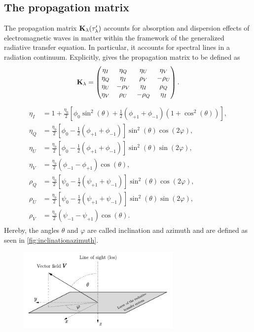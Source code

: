 \documentclass[a4paper,12pt]{report}
\def\lk#1{{\color{black}{#1}}}
\begin{document}
\subsection{The propagation matrix}\label{sec:propagationmatrix}
The propagation matrix $\boldsymbol{\mathbf{K}}_\lambda(\tau_\lambda^\prime)$ accounts for absorption and dispersion effects of electromagnetic waves in matter within the framework of the generalized radiative transfer equation. In particular, it accounts for spectral lines in a radiation continuum. Explicitly, \cite[p.154]{Stix.2002} gives the propagation matrix to be defined as \begin{equation}
\boldsymbol{\mathbf{K}}_\lambda = \begin{pmatrix}
\eta_I & \eta_Q & \eta_U & \eta_V \\
\eta_Q & \eta_I & \rho_V & -\rho_U \\
\eta_U & -\rho_V & \eta_I & \rho_Q \\
\eta_V & \rho_U & -\rho_Q & \eta_I
\end{pmatrix}.
\end{equation} \cite[p.116]{delToroIniesta.2003} \lk{gives the individual entries of this matrix as} \begin{align}\begin{aligned}
\eta_I &= 1 + \frac{\eta_0}{2}\left[\phi_0\sin^2(\theta) + \frac{1}{2}(\phi_{+1}+\phi_{-1})(1+\cos^2(\theta))\right], \\
\eta_Q &= \frac{\eta_0}{2}\left[\phi_0-\frac{1}{2}(\phi_{+1}+\phi_{-1})\right]\sin^2(\theta)\cos(2\varphi), \\
\eta_U &= \frac{\eta_0}{2}\left[\phi_0 - \frac{1}{2}(\phi_{+1}+\phi_{-1})\right]\sin^2(\theta)\sin(2\varphi), \\
\eta_V &= \frac{\eta_0}{2}(\phi_{-1}-\phi_{+1})\cos(\theta), \\
\rho_Q &= \frac{\eta_0}{2}\left[\psi_0-\frac{1}{2}(\psi_{+1}+\psi_{-1})\right]\sin^2(\theta)\cos(2\varphi), \\
\rho_U &= \frac{\eta_0}{2}\left[\psi_0-\frac{1}{2}(\psi_{+1}+\psi_{-1})\right]\sin^2(\theta)\sin(2\varphi), \\
\rho_V &= \frac{\eta_0}{2}(\psi_{-1}-\psi_{+1})\cos(\theta).
\end{aligned}
\end{align} Hereby, the angles $\theta$ and $\varphi$ are called inclination and azimuth and are defined as seen in \cref{fig:inclinationazimuth}. \begin{figure}[h]
\centering
\includegraphics[width=8cm]{figures/inclinationazimuth.pdf}

\end{figure}
\end{document}
